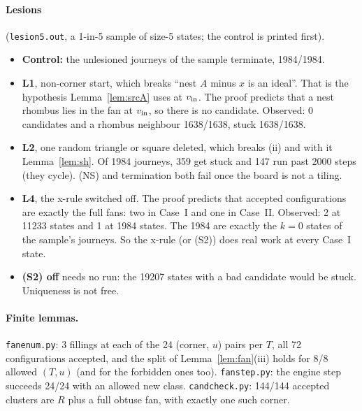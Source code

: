 \documentclass[11pt]{article}
\theoremstyle{definition}\newtheorem{definition}[theorem]{Definition}\newtheorem{remark}[theorem]{Remark}
\begin{document}
\paragraph{Lesions} (\texttt{lesion5.out}, a 1-in-5 sample of size-5 states; the control is printed first).
\begin{itemize}
\item \textbf{Control:} the unlesioned journeys of the sample terminate, 1984/1984.
\item \textbf{L1}, non-corner start, which breaks ``nest $A$ minus $x$ is an ideal''. That is the hypothesis Lemma~\ref{lem:srcA} uses at $v_{\rm in}$. The proof predicts that a nest rhombus lies in the fan at $v_{\rm in}$, so there is no candidate. Observed: 0 candidates and a rhombus neighbour 1638/1638, stuck 1638/1638.
\item \textbf{L2}, one random triangle or square deleted, which breaks (ii) and with it Lemma~\ref{lem:sh}. Of 1984 journeys, 359 get stuck and 147 run past 2000 steps (they cycle). (NS) and termination both fail once the board is not a tiling.
\item \textbf{L4}, the x-rule switched off. The proof predicts that accepted configurations are exactly the full fans: two in Case~I and one in Case~II. Observed: 2 at 11233 states and 1 at 1984 states. The 1984 are exactly the $k=0$ states of the sample's journeys. So the x-rule (or (S2)) does real work at every Case~I state.
\item \textbf{(S2) off} needs no run: the 19207 states with a bad candidate would be stuck. Uniqueness is not free.
\end{itemize}
\paragraph{Finite lemmas.} \texttt{fanenum.py}: 3 fillings at each of the 24 (corner, $u$) pairs per $T$, all 72 configurations accepted, and the split of Lemma~\ref{lem:fan}(iii) holds for 8/8 allowed $(T,u)$ (and for the forbidden ones too). \texttt{fanstep.py}: the engine step succeeds 24/24 with an allowed new class. \texttt{candcheck.py}: 144/144 accepted clusters are $R$ plus a full obtuse fan, with exactly one such corner.
\end{document}

